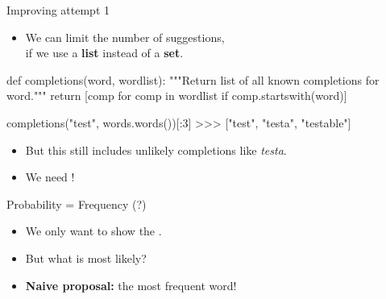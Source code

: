 \documentclass[professionalfonts, xcolor={usenames,svgnames,x11names,table}]{beamer}
\begin{document}
\begin{frame}[fragile]{Improving attempt 1}
    \begin{itemize}
        \item We can limit the number of suggestions,\\
              if we use a \textbf{list} instead of a \textbf{set}.
    \end{itemize}
    \begin{pythoncode}
        def completions(word, wordlist):
            """Return list of all known completions for word."""
            return [comp for comp in wordlist
                    if comp.startswith(word)]

        completions("test", words.words())[:3]
        >>> ["test", "testa", "testable"]
    \end{pythoncode}
    \begin{itemize}
        \item But this still includes unlikely completions like \emph{testa}.
        \item We need !
    \end{itemize}
\end{frame}

\begin{frame}{Probability = Frequency (?)}
    \begin{itemize}
        \item We only want to show the .
        \item But what is most likely?
        \item \textbf{Naive proposal:} the most frequent word!
    \end{itemize}

\end{frame}
\end{document}
